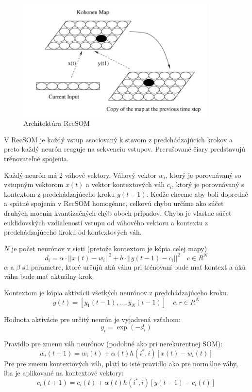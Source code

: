 \begin{figure}[H]
	\centering
	\includegraphics[width=10cm]{assets/rec_som}
	\caption{Architektúra RecSOM}
\end{figure}

V RecSOM je každý vstup asociovaný k stavom z predchádzajúcich krokov a preto každý 
neurón reaguje na sekvenciu vstupov.
Prerušované čiary predstavujú trénovateľné spojenia.

Každý neurón má 2 váhové vektory. Váhový vektor $w_i$, ktorý je porovnávaný so
vstupným vektorom $x(t)$ a vektor kontextových váh $c_i$, ktorý je porovnávaný s kontextom z predchádzajúceho
kroku $y(t-1)$. Kedže chceme aby boli dopredné a spätné spojenia v RecSOM homogénne, 
celkovú chybu určíme ako súčet druhých mocnín kvantizačných chýb oboch prípadov. Chyba je vlastne súčet euklidovských vzdialeností
vstupu od váhového vektoru a kontextu z predchádzajúceho kroku od kontextových váh. 

$N$ je počet neurónov v sieti (pretože kontextom je kópia celej mapy)
\begin{equation}
	d_i = \alpha \cdot ||x(t) - w_i||^{2} + b \cdot ||y(t-1) - c_i||^{2} \quad c \in R^{N}
\end{equation}
$\alpha$ a $\beta$ sú parametre, ktoré určujú akú váhu pri trénovaní bude mať kontext a akú váhu bude mať
aktuálny krok.

Kontextom je kópia aktivácii všetkých neurónov z predchádzajúceho kroku.
\begin{equation}
	y(t) = [y_1(t-1), ..., y_{N}(t-1)]  \quad c, r \in R^{N}
\end{equation}

Hodnota aktivácie pre určitý neurón je vyjadrená vzťahom:
\begin{equation}
	y_i = \exp(-d_i)
\end{equation}

Pravidlo pre zmenu váh neurónov (podobné ako pri nerekurentnej SOM):
\begin{equation}
	w_i(t + 1) = w_i(t) + \alpha(t)h(i^*, i)[x(t) - w_i(t)]
\end{equation}
Pre pre zmenu kontextových váh, platí to isté pravidlo ako pre normálne váhy, iba je aplikované 
na kontextové vektory:
\begin{equation}
	c_i(t + 1) = c_i(t) + \alpha(t)h(i^*, i)[y(t - 1) - c_i(t)]
\end{equation}

